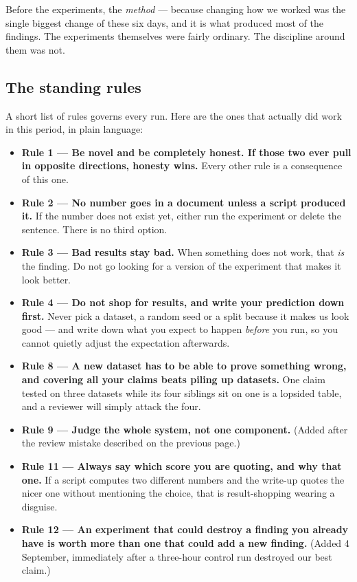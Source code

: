 \documentclass[11pt]{article}
\begin{document}
Before the experiments, the \emph{method} --- because changing how we worked was the single biggest
change of these six days, and it is what produced most of the findings. The experiments themselves were
fairly ordinary. The discipline around them was not.

\subsection{The standing rules}

A short list of rules governs every run. Here are the ones that actually did work in this period, in
plain language:

\begin{itemize}
  \item \textbf{Rule 1 --- Be novel and be completely honest. If those two ever pull in opposite
  directions, honesty wins.} Every other rule is a consequence of this one.
  \item \textbf{Rule 2 --- No number goes in a document unless a script produced it.} If the number does
  not exist yet, either run the experiment or delete the sentence. There is no third option.
  \item \textbf{Rule 3 --- Bad results stay bad.} When something does not work, that \emph{is} the
  finding. Do not go looking for a version of the experiment that makes it look better.
  \item \textbf{Rule 4 --- Do not shop for results, and write your prediction down first.} Never pick a
  dataset, a random seed or a split because it makes us look good --- and write down what you expect to
  happen \emph{before} you run, so you cannot quietly adjust the expectation afterwards.
  \item \textbf{Rule 8 --- A new dataset has to be able to prove something wrong, and covering all your
  claims beats piling up datasets.} One claim tested on three datasets while its four siblings sit on
  one is a lopsided table, and a reviewer will simply attack the four.
  \item \textbf{Rule 9 --- Judge the whole system, not one component.} (Added after the review mistake
  described on the previous page.)
  \item \textbf{Rule 11 --- Always say which score you are quoting, and why that one.} If a script
  computes two different numbers and the write-up quotes the nicer one without mentioning the choice,
  that is result-shopping wearing a disguise.
  \item \textbf{Rule 12 --- An experiment that could destroy a finding you already have is worth more
  than one that could add a new finding.} (Added 4 September, immediately after a three-hour control run
  destroyed our best claim.)
\end{itemize}
\end{document}
